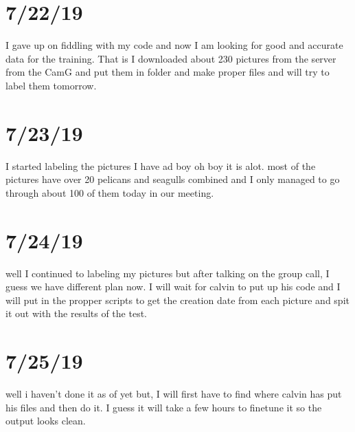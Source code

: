 \documentclass{article}
\begin{document}
\section{7/22/19}
I gave up on fiddling with my code and now I am looking for good and accurate data for the training. That is I downloaded about 230 pictures from the server from the CamG and put them in folder and make proper files and will try to label them tomorrow.

\section{7/23/19}
I started labeling the pictures I have ad boy oh boy it is alot. most of the pictures have over 20 pelicans and seagulls combined and I only managed to go through about 100 of them today in our meeting.

\section{7/24/19}
well I continued to labeling my pictures but after talking on the group call, I guess we have different plan now. I will wait for calvin to put up his code and I will put in the propper scripts to get the creation date from each picture and spit it out with the results of the test. 

\section{7/25/19}
well i haven't done it as of yet but, I will first have to find where calvin has put his files and then do it. I guess it will take a few hours to finetune it so the output looks clean.
\end{document}
